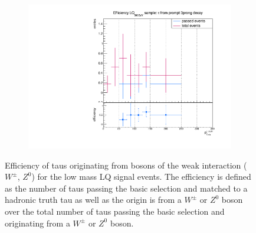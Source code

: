 \begin{figure}
\begin{subfigure}[t]{0.49\textwidth}
                \label{Dividedprompt:signal:1prongLQ75}
                \end{subfigure}
                \begin{subfigure}[t]{0.49\textwidth}
                \includegraphics[width=\textwidth]{figures/plots/LQ75/Divided_prompt3prong.pdf}
                \label{Dividedprompt:signal:3prongLQ75}
                \end{subfigure}
\caption[Efficiency of taus originating from bosons of the weak interaction ($W^\pm$, $Z^0$) for the low mass LQ signal events.]{Efficiency of taus originating from bosons of the weak interaction ($W^\pm$, $Z^0$) for the low mass LQ signal events. The efficiency is defined as the number of taus passing the basic selection and matched to a hadronic truth tau as well as the origin is from a $W^\pm$ or $Z^0$ boson over the total number of taus passing the basic selection and originating from a $W^\pm$ or $Z^0$ boson.}
\label{Dividedprompt:signal:LQ75}
\end{figure}
%
%
